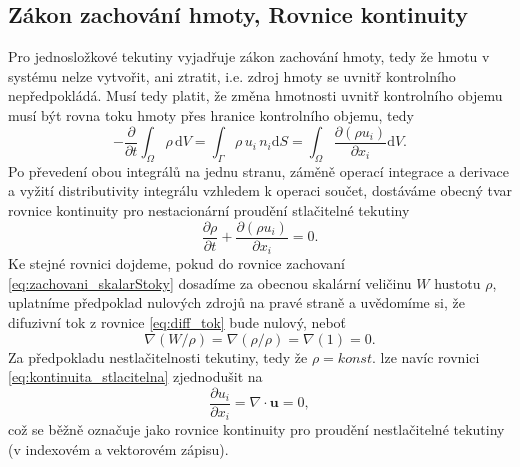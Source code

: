 \subsection{Zákon zachování hmoty, Rovnice kontinuity}
Pro jednosložkové tekutiny vyjadřuje zákon zachování hmoty, tedy že hmotu v systému nelze vytvořit, ani ztratit, i.e. zdroj hmoty se uvnitř kontrolního nepředpokládá. Musí tedy platit, že změna hmotnosti uvnitř kontrolního objemu musí být rovna toku hmoty přes hranice kontrolního objemu, tedy
\begin{equation}
-\dfrac{\partial}{\partial t}\int_\Omega \rho \,\mathrm{d}V = \int_\Gamma \rho \, u_i \, n_i \mathrm{d}S = \int_\Omega \dfrac{\partial\left(\rho u_i\right)}{\partial x_i}\mathrm{d}V.
\end{equation}
Po převedení obou integrálů na jednu stranu, záměně operací integrace a derivace a vyžití distributivity integrálu vzhledem k operaci součet, dostáváme obecný tvar rovnice kontinuity pro nestacionární proudění stlačitelné tekutiny
\begin{equation}\label{eq:kontinuita_stlacitelna}
\dfrac{\partial \rho}{\partial t} + \dfrac{\partial \left(\rho u_i\right)}{\partial x_i} = 0.
\end{equation}
Ke stejné rovnici dojdeme, pokud do rovnice zachovaní \ref{eq:zachovani_skalarStoky} dosadíme za obecnou skalární veličinu $W$ hustotu $\rho$, uplatníme předpoklad nulových zdrojů na pravé straně a uvědomíme si, že difuzivní tok z rovnice \ref{eq:diff_tok} bude nulový, neboť 
\begin{equation}
\nabla(W/\rho) = \nabla(\rho/\rho) = \nabla(1) = 0.
\end{equation} 
Za předpokladu nestlačitelnosti tekutiny, tedy že $\rho = konst.$ lze navíc rovnici \ref{eq:kontinuita_stlacitelna} zjednodušit na 
\begin{equation}\label{eq:kontinuita_nestlacitelna}
\dfrac{\partial u_i}{\partial x_i} = \nabla\cdot\mathbf{u} = 0,
\end{equation}
což se běžně označuje jako rovnice kontinuity pro proudění nestlačitelné tekutiny (v indexovém a vektorovém zápisu).


